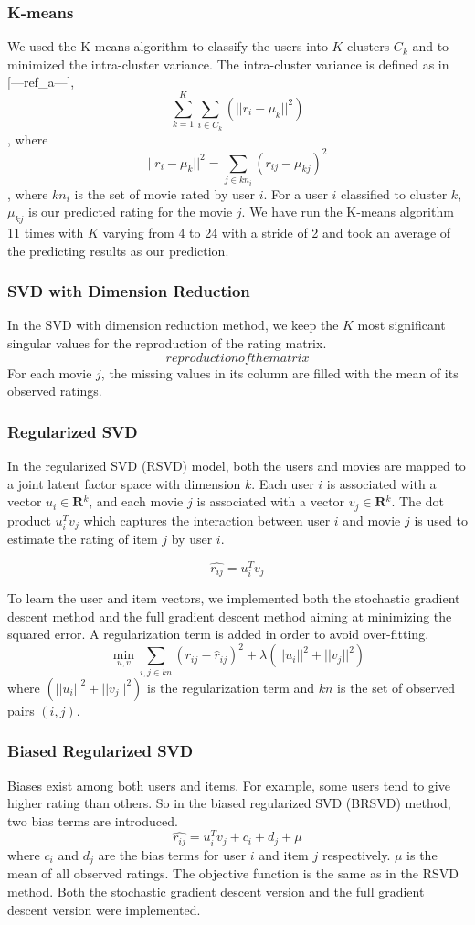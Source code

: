 \documentclass[10pt,conference,compsocconf]{IEEEtran}
\begin{document}
\subsubsection{K-means}
We used the K-means algorithm to classify the users into $K$ clusters $C_k$ and to minimized the intra-cluster variance. The intra-cluster variance is defined as in [---ref\_a---], $$   \sum_{k=1}^K \sum_{i \in C_k} (||r_{i}-\mu_k||^2)  $$, where $$  ||r_{i}-\mu_k||^2 = \sum_{j \in kn_i}(r_{ij}-\mu_{kj})^2  $$, where $kn_i$ is the set of movie rated by user $i$.
 For a user $i$ classified to cluster $k$, $\mu_{kj}$ is our predicted rating for the movie $j$. We have run the K-means algorithm 11 times with $K$ varying from 4 to 24 with a stride of 2 and took an average of the predicting results as our prediction.

\subsubsection{SVD with Dimension Reduction}
In the SVD with dimension reduction method, we keep the $K$ most significant singular values for the reproduction of the rating matrix. $$reproduction of the matrix$$ For each movie $j$, the missing values in its column are filled with the mean of its observed ratings.

\subsubsection{Regularized SVD}
In the regularized SVD (RSVD) model, both the users and movies are mapped to a joint latent factor space with dimension $k$. Each user $i$ is associated with a vector $u_{i} \in \textbf{R$^k$}$, and each movie $j$ is associated with a vector $v_{j} \in \textbf{R$^k$} $. The dot product $u_i^Tv_j$ which captures the interaction between user $i$ and movie $j$ is used to estimate the rating of item $j$ by user $i$.

$$ \hat{r_{ij}}=u_{i}^{T}v_{j} $$

To learn the user and item vectors, we implemented both the stochastic gradient descent method and the full gradient descent method aiming at minimizing the squared error. A regularization term is added in order to avoid over-fitting.
$$  \min \limits_{u, v} \sum_{i, j\in kn} (r_{ij} - \hat r_{ij})^2 + \lambda (||u_i||^2 + ||v_j||^2)  $$
where $ (||u_i||^2 + ||v_j||^2)$ is the regularization term and $kn$ is the set of observed pairs $(i, j)$.

\subsubsection{Biased Regularized SVD}
Biases exist among both users and items. For example, some users tend to give higher rating than others. So in the biased regularized SVD (BRSVD) method, two bias terms are introduced.
$$ \hat{r_{ij}}=u_{i}^{T}v_{j} + c_i + d_j  + \mu $$
where $c_i$ and $d_j$ are the bias terms for user $i$ and item $j$ respectively. $\mu$ is the mean of all observed ratings. The objective function is the same as in the RSVD method.
Both the stochastic gradient descent version and the full gradient descent version were implemented.
\end{document}

